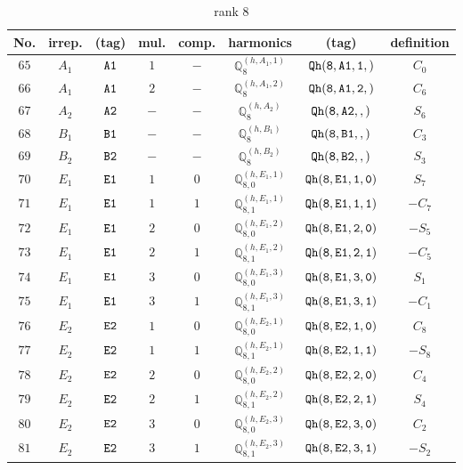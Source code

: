 \documentclass[fleqn,8pt]{jsarticle}
\begin{document}
\begin{table}[ht!]
\begin{center}
\caption{rank 8}
\renewcommand{\arraystretch}{1.3}
\begin{tabular}{cccccccc} \hline \hline
No. & irrep. & (tag) & mul. & comp. & harmonics & (tag) & definition \\ \hline
$ 65 $ & $ A_{1} $ & $ {\tt A1} $ & $ 1 $ & $ - $ & $ \mathbb{Q}_{8}^{(h,A_{1},1)} $ & $ {\tt Qh(8,A1,1,)} $ & $ C_{0} $ \\
$ 66 $ & $ A_{1} $ & $ {\tt A1} $ & $ 2 $ & $ - $ & $ \mathbb{Q}_{8}^{(h,A_{1},2)} $ & $ {\tt Qh(8,A1,2,)} $ & $ C_{6} $ \\
$ 67 $ & $ A_{2} $ & $ {\tt A2} $ & $ - $ & $ - $ & $ \mathbb{Q}_{8}^{(h,A_{2})} $ & $ {\tt Qh(8,A2,,)} $ & $ S_{6} $ \\
$ 68 $ & $ B_{1} $ & $ {\tt B1} $ & $ - $ & $ - $ & $ \mathbb{Q}_{8}^{(h,B_{1})} $ & $ {\tt Qh(8,B1,,)} $ & $ C_{3} $ \\
$ 69 $ & $ B_{2} $ & $ {\tt B2} $ & $ - $ & $ - $ & $ \mathbb{Q}_{8}^{(h,B_{2})} $ & $ {\tt Qh(8,B2,,)} $ & $ S_{3} $ \\
$ 70 $ & $ E_{1} $ & $ {\tt E1} $ & $ 1 $ & $ 0 $ & $ \mathbb{Q}_{8,0}^{(h,E_{1},1)} $ & $ {\tt Qh(8,E1,1,0)} $ & $ S_{7} $ \\
$ 71 $ & $ E_{1} $ & $ {\tt E1} $ & $ 1 $ & $ 1 $ & $ \mathbb{Q}_{8,1}^{(h,E_{1},1)} $ & $ {\tt Qh(8,E1,1,1)} $ & $ - C_{7} $ \\
$ 72 $ & $ E_{1} $ & $ {\tt E1} $ & $ 2 $ & $ 0 $ & $ \mathbb{Q}_{8,0}^{(h,E_{1},2)} $ & $ {\tt Qh(8,E1,2,0)} $ & $ - S_{5} $ \\
$ 73 $ & $ E_{1} $ & $ {\tt E1} $ & $ 2 $ & $ 1 $ & $ \mathbb{Q}_{8,1}^{(h,E_{1},2)} $ & $ {\tt Qh(8,E1,2,1)} $ & $ - C_{5} $ \\
$ 74 $ & $ E_{1} $ & $ {\tt E1} $ & $ 3 $ & $ 0 $ & $ \mathbb{Q}_{8,0}^{(h,E_{1},3)} $ & $ {\tt Qh(8,E1,3,0)} $ & $ S_{1} $ \\
$ 75 $ & $ E_{1} $ & $ {\tt E1} $ & $ 3 $ & $ 1 $ & $ \mathbb{Q}_{8,1}^{(h,E_{1},3)} $ & $ {\tt Qh(8,E1,3,1)} $ & $ - C_{1} $ \\
$ 76 $ & $ E_{2} $ & $ {\tt E2} $ & $ 1 $ & $ 0 $ & $ \mathbb{Q}_{8,0}^{(h,E_{2},1)} $ & $ {\tt Qh(8,E2,1,0)} $ & $ C_{8} $ \\
$ 77 $ & $ E_{2} $ & $ {\tt E2} $ & $ 1 $ & $ 1 $ & $ \mathbb{Q}_{8,1}^{(h,E_{2},1)} $ & $ {\tt Qh(8,E2,1,1)} $ & $ - S_{8} $ \\
$ 78 $ & $ E_{2} $ & $ {\tt E2} $ & $ 2 $ & $ 0 $ & $ \mathbb{Q}_{8,0}^{(h,E_{2},2)} $ & $ {\tt Qh(8,E2,2,0)} $ & $ C_{4} $ \\
$ 79 $ & $ E_{2} $ & $ {\tt E2} $ & $ 2 $ & $ 1 $ & $ \mathbb{Q}_{8,1}^{(h,E_{2},2)} $ & $ {\tt Qh(8,E2,2,1)} $ & $ S_{4} $ \\
$ 80 $ & $ E_{2} $ & $ {\tt E2} $ & $ 3 $ & $ 0 $ & $ \mathbb{Q}_{8,0}^{(h,E_{2},3)} $ & $ {\tt Qh(8,E2,3,0)} $ & $ C_{2} $ \\
$ 81 $ & $ E_{2} $ & $ {\tt E2} $ & $ 3 $ & $ 1 $ & $ \mathbb{Q}_{8,1}^{(h,E_{2},3)} $ & $ {\tt Qh(8,E2,3,1)} $ & $ - S_{2} $ \\
 \hline \hline
\end{tabular}
\end{center}
\end{table}
\end{document}
